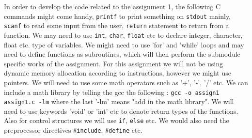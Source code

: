 \documentclass[a4paper,12 pt]{article}
\begin{document}
In order to develop the code related to the assignment 1, the following C commands might come handy, \texttt{printf} to print something on \texttt{stdout} mainly, \texttt{scanf} to read some input from the user, \texttt{return} statement to return from a function. We may need to use \texttt{int}, \texttt{char}, \texttt{float} etc to declare integer, character, float etc. type of variables. We might need to use 'for' and 'while' loops and may need to define functions as subroutines, which will then perform the submodule specific works of the assignment. For this assignment we will not be using dynamic memory allocation according to instructions, however we might use pointers. We will need to use some math operators such as '+', '-', '/' etc. We can include a math library by telling the gcc the following : \texttt{gcc  -o assign1 assign1.c -lm} where the last '-lm' means "add in the math library". We will need to use keywords 'void' or 'int' etc to denote return types of the functions. Also for control structures we will use \texttt{if}, \texttt{else} etc. We would also need the preprocessor directives \texttt{\#include}, \texttt{\#define} etc.
\end{document}
